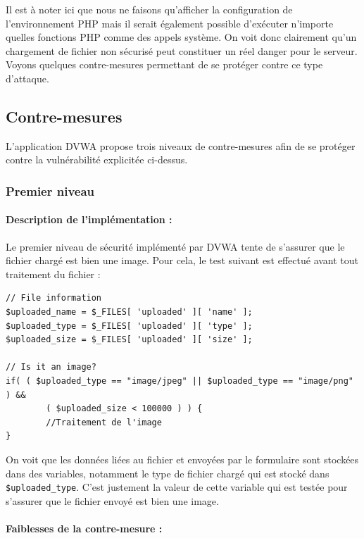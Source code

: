Il est à noter ici que nous ne faisons qu'afficher la configuration de l'environnement PHP mais il serait également possible d'exécuter n'importe quelles fonctions PHP comme des appels système. On voit donc clairement qu'un chargement de fichier non sécurisé peut constituer un réel danger pour le serveur. Voyons quelques contre-mesures permettant de se protéger contre ce type d'attaque.



\subsection{Contre-mesures}

L'application DVWA propose trois niveaux de contre-mesures afin de se protéger contre la vulnérabilité explicitée ci-dessus.

\subsubsection{Premier niveau}


\paragraph{Description de l'implémentation :}

Le premier niveau de sécurité implémenté par DVWA tente de s'assurer que le fichier chargé est bien une image. Pour cela, le test suivant est effectué avant tout traitement du fichier :

\begin{lstlisting}
// File information
$uploaded_name = $_FILES[ 'uploaded' ][ 'name' ];
$uploaded_type = $_FILES[ 'uploaded' ][ 'type' ];
$uploaded_size = $_FILES[ 'uploaded' ][ 'size' ];

// Is it an image? 
if( ( $uploaded_type == "image/jpeg" || $uploaded_type == "image/png" ) && 
        ( $uploaded_size < 100000 ) ) { 
        //Traitement de l'image
}
\end{lstlisting}

On voit que les données liées au fichier et envoyées par le formulaire sont stockées dans des variables, notamment le type de fichier chargé qui est stocké dans \texttt{\$uploaded\_type}. C'est justement la valeur de cette variable qui est testée pour s'assurer que le fichier envoyé est bien une image.

\paragraph{Faiblesses de la contre-mesure :}

